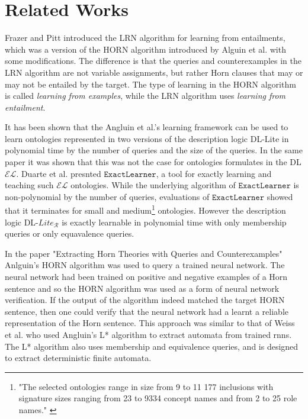 \chapter{Related Works}

Frazer and Pitt introduced the LRN algorithm for learning from entailments, \cite{DBLP:conf/icml/FrazierP93} which was a version of the HORN algorithm introduced by Alguin et al. \cite{DBLP:journals/ml/AngluinFP92} with some modifications. The difference is that the queries and counterexamples in the LRN algorithm are not variable assignments, but rather Horn clauses that may or may not be entailed by the target. The type of learning in the HORN algorithm is called \emph{learning from examples}, while the LRN algorithm uses \emph{learning from entailment}.

It has been shown that the Angluin et al.'s learning framework can be used to learn ontologies represented in two versions of the description logic DL-Lite in polynomial time by the number of queries and the size of the queries. \cite{DL_lite} In the same paper it was shown that this was not the case for ontologies formulates in the DL $\mathcal{EL}$. Duarte et al. \cite{duarte2018exactlearner} presnted $\texttt{ExactLearner}$, a tool for exactly learning and teaching such $\mathcal{EL}$ ontologies. While the underlying algorithm of $\texttt{ExactLearner}$ is non-polynomial by the number of queries, evaluations of $\texttt{ExactLearner}$ showed that it terminates for small and medium\footnote{"The selected ontologies range in size from 9 to 11 177 inclusions with signature
sizes ranging from 23 to 9334 concept names and from 2 to 25 role names."  \cite{duarte2018exactlearner}} ontologies. However the description logic DL-$Lite_{\mathcal{R}}$ is exactly learnable in polynomial time with only membership queries or only equavalence queries. \cite{Ozaki2020}



In the paper "Extracting Horn Theories with Queries and Counterexamples"  Anlguin's HORN algorithm was used to query a trained neural network. The neural network had been trained on positive and negative examples of a Horn sentence and so the HORN algorithm was used as a form of neural network verification. If the output of the algorithm indeed matched the target HORN sentence, then one could verify that the neural network had a learnt a reliable representation of the Horn sentence. This approach was similar to that of Weiss et al.\cite{pmlr-v80-weiss18a} who used Angluin’s L* algorithm \cite{ANGLUIN198787} to extract automata from trained \gls{rnn}s. The L* algorithm also uses membership and equivalence queries, and is designed to extract deterministic finite automata.